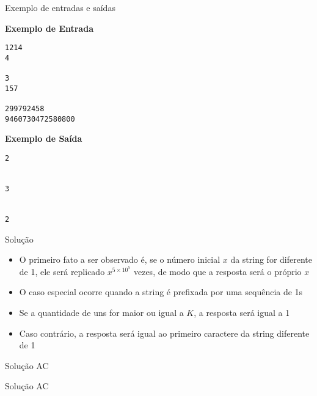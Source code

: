\begin{frame}[fragile]{Exemplo de entradas e saídas}

\begin{minipage}[t]{0.5\textwidth}
\textbf{Exemplo de Entrada}
\begin{verbatim}
1214
4

3
157

299792458
9460730472580800
\end{verbatim}
\end{minipage}
\begin{minipage}[t]{0.45\textwidth}
\textbf{Exemplo de Saída}
\begin{verbatim}
2


3


2
\end{verbatim}
\end{minipage}
\end{frame}

\begin{frame}[fragile]{Solução}

    \begin{itemize}
        \item O primeiro fato a ser observado é, se o número inicial $x$ da string for diferente de 
        1, ele será replicado $x^{5\times 10^5}$ vezes, de modo que a resposta será o próprio $x$

        \item O caso especial ocorre quando a string é prefixada por uma sequência de 1s

        \item Se a quantidade de uns for maior ou igual a $K$, a resposta será igual a 1

        \item Caso contrário, a resposta será igual ao primeiro caractere da string diferente de
            1
    \end{itemize}

\end{frame}

\begin{frame}[fragile]{Solução AC}
\end{frame}

\begin{frame}[fragile]{Solução AC}
\end{frame}
